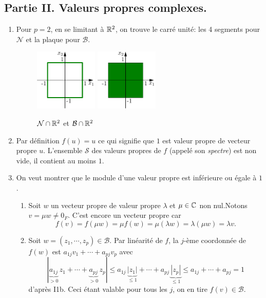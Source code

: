 \subsection*{Partie II. Valeurs propres complexes.}
\begin{enumerate}
 \item Pour $p=2$, en se limitant à $\mathbb{R}^2$, on trouve le carré unité: les 4 segments pour $\mathcal{N}$ et la plaque pour $\mathcal{B}$.

\begin{figure}[h!]
  \centering 
    \includegraphics[width=3cm]{Cperron_1.pdf}
    \hspace{2cm}
    \includegraphics[width=3cm]{Cperron_2.pdf}
    \caption{$\mathcal{N} \cap \mathbb{R}^2$ et $\mathcal{B} \cap \mathbb{R}^2$}
\end{figure} 

  \item Par définition $f(u)=u$ ce qui signifie que $1$ est valeur propre de vecteur propre $u$. L'ensemble $\mathcal{S}$ des valeurs propres de $f$ (appelé son \emph{spectre}) est non vide, il contient au moins $1$.
  
  \item On veut montrer que le module d'une valeur propre est inférieure ou égale à $1$.
  \begin{enumerate}
     \item Soit $w$ un vecteur propre de valeur propre $\lambda$ et $\mu \in \mathbb{C}$ non nul.\newline Notons $v = \mu w \neq 0_F$. C'est encore un vecteur propre car 
\[
  f(v) = f(\mu w) = \mu f(w) = \mu (\lambda w) = \lambda (\mu w) = \lambda v.
\]

     \item \label{stabB} Soit $w = (z_1,\cdots,z_p)\in \mathcal{B}$. Par linéarité de $f$, la $j$-ème coordonnée de $f(w)$ est $a_{1 j}v_1 + \cdots + a_{p j} v_p$ avec 
\[
 |\underset{ >0}{\underbrace{a_{1 j}}}\,z_1 + \cdots + \underset{ >0}{\underbrace{a_{p j}}}\, z_p | \leq 
 a_{1 j}\,\underset{ \leq 1}{\underbrace{|z_1|}} + \cdots +  a_{p j}\,\underset{ \leq 1}{\underbrace{|z_p|}} \leq  a_{1 j} + \cdots + a_{p j} =  1 
\]
d'après I1b. Ceci étant valable pour tous les $j$, on en tire $f(v)\in\mathcal{B}$.


\end{enumerate}
\end{enumerate}
